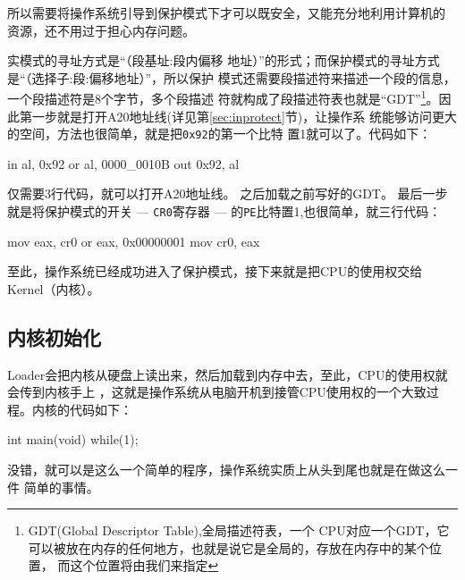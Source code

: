 所以需要将操作系统引导到保护模式下才可以既安全，又能充分地利用计算机的
资源，还不用过于担心内存问题。

实模式的寻址方式是“（段基址:段内偏移
地址）”的形式；而保护模式的寻址方式是“（选择子:段:偏移地址）”，所以保护
模式还需要段描述符来描述一个段的信息，一个段描述符是8个字节，多个段描述
符就构成了段描述符表也就是“GDT”\footnote{GDT(Global Descriptor Table)\cite{chxs2012},全局描述符表，一个
  CPU对应一个GDT，它可以被放在内存的任何地方，也就是说它是全局的，存放在内存中的某个位置，
  而这个位置将由我们来指定}。因此第一步就是打开A20地址线(详见第\ref{sec:inprotect}节)，让操作系
统能够访问更大的空间，方法也很简单，就是把\texttt{0x92}的第一个比特
置1就可以了。代码如下：
\begin{codeblock}
\begin{nasmcode}
in al, 0x92
or al, 0000_0010B
out 0x92, al
\end{nasmcode}  
\end{codeblock}
仅需要3行代码，就可以打开A20地址线。
之后加载之前写好的GDT。
最后一步就是将保护模式的开关 --- \texttt{CR0}寄存器 --- 的\texttt{PE}比特置1,也很简单，就三行代码：

\begin{codeblock}
\begin{nasmcode}
mov eax, cr0
or  eax, 0x00000001
mov cr0, eax
\end{nasmcode}  
\end{codeblock}

至此，操作系统已经成功进入了保护模式，接下来就是把CPU的使用权交给Kernel（内核）。

\subsection{内核初始化}

Loader会把内核从硬盘上读出来，然后加载到内存中去，至此，CPU的使用权就会传到内核手上
，这就是操作系统从电脑开机到接管CPU使用权的一个大致过程。内核的代码如下：

\begin{codeblock}
\begin{ccode}
int main(void)
{
    while(1);
}
\end{ccode}  
\end{codeblock}

没错，就可以是这么一个简单的程序，操作系统实质上从头到尾也就是在做这么一件
简单的事情。


